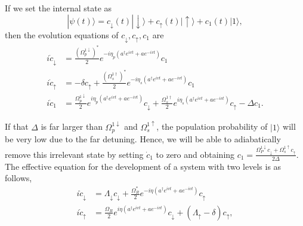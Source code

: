 If we set the internal state as
\begin{equation}
    |\psi(t)\rangle=c_{\downarrow}(t)|\downarrow\rangle+c_{\uparrow}(t)|\uparrow\rangle+c_1(t)|1\rangle,
\end{equation}
then the evolution equations of $c_{\downarrow},c_{\uparrow},c_1$ are
\begin{equation}
    \begin{aligned}
        i \dot{c}_{\downarrow} & =\frac{\left(\Omega_p^{1 \downarrow}\right)^*}{2} e^{-i \eta_p\left(a^{\dagger} e^{i v t}+a e^{-i v t}\right)} c_1                                                                                                                 \\
        i \dot{c}_{\uparrow}   & =-\delta c_{\uparrow}+\frac{\left(\Omega_s^{1 \dagger}\right)^*}{2} e^{-i \eta_s\left(a^{\dagger} e^{i v t}+a e^{-i v t}\right)} c_1                                                                                               \\
        i \dot{c}_1            & =\frac{\Omega_p^{1 \downarrow}}{2} e^{i \eta_p\left(a^{\dagger} e^{i v t}+a e^{-i v t}\right)} c_{\downarrow}+\frac{\Omega_s^{1 \dagger}}{2} e^{i \eta_s\left(a^{\dagger} e^{i v t}+a e^{-i v t}\right)} c_{\uparrow}-\Delta c_1 .
    \end{aligned}
\end{equation}

If that $\Delta$ is far larger than $\Omega^{1\downarrow}_p$ and $\Omega^{1\uparrow}_s$, the population probability of $|1\rangle$ will be very low due to the far detuning. Hence, we will be able to adiabatically remove this irrelevant state by setting $\dot{c}_1$ to zero and obtaining  $c_1=\frac{\Omega^{1\downarrow}_P c_{\downarrow}+\Omega^{1\uparrow}_s c_{\uparrow}}{2\Delta}$. The effective equation for the development of a system with two levels is as follows,
\begin{equation}
    \begin{aligned}
        i \dot{c}_{\downarrow} & =\Lambda_{\downarrow} c_{\downarrow}+\frac{\Omega_R^*}{2} e^{-i \eta\left(a^{\dagger} e^{i v t}+a e^{-i v t}\right)} c_{\uparrow}                 \\
        i \dot{c}_{\uparrow}   & =\frac{\Omega_R}{2} e^{i \eta\left(a^{\dagger} e^{i v t}+a e^{-i v t}\right)} c_{\downarrow}+\left(\Lambda_{\uparrow}-\delta\right) c_{\uparrow},
    \end{aligned}
\end{equation}

